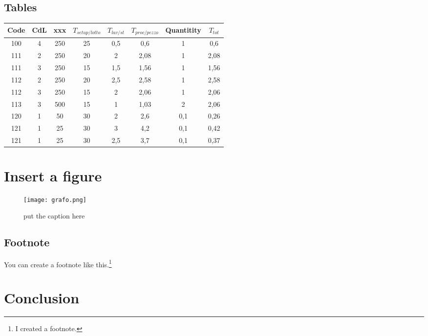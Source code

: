 \documentclass[12pt, a4paper, twoside]{article}
\theoremstyle{definition}
\theoremstyle{plain}
\theoremstyle{remark}
\begin{document}
\subsection{Tables}
\begin{center}
\begin{tabular}{c c c c c c c c}
\arrayrulecolor{Azzurro}
\hline
{\bfseries Code} & {\bfseries CdL} & {\bfseries xxx} & {\bfseries $T_{setup/lotto}$} & {\bfseries $T_{lav/st}$} & {\bfseries $T_{proc/pezzo}$} & {\bfseries Quantitity} & {\bfseries $T_{tot}$}\\
\hline
100 & 4 & 250 & 25 & 0,5 & 0,6 & 1 & 0,6\\
111 & 2 & 250 & 20 & 2 & 2,08 & 1 & 2,08 \\
111 & 3 & 250 & 15 & 1,5 & 1,56 & 1 & 1,56 \\
112 & 2 & 250 & 20 & 2,5 & 2,58 & 1 & 2,58 \\
112 & 3 & 250 & 15 & 2 & 2,06 & 1 & 2,06\\
113 & 3 & 500 & 15 & 1 & 1,03 & 2 & 2,06\\
120 & 1 & 50 & 30 & 2 & 2,6 & 0,1 & 0,26\\
121 & 1 & 25 & 30 & 3 & 4,2 & 0,1 & 0,42 \\
121 & 1 & 25 & 30 & 2,5 & 3,7 & 0,1 & 0,37 \\
\hline
\end{tabular}
\end{center}



\clearpage{\thispagestyle{empty}\cleardoublepage}

\section{Insert a figure}
\begin{figure}[H]
\centering
\texttt{[image: grafo.png]}
\caption{\label{fig:1} put the caption here}
\end{figure}

\subsection{Footnote}

You can create a footnote like this.\footnote{I created a footnote.}



\clearpage{\thispagestyle{empty}\cleardoublepage}
\section{Conclusion}
\end{document}
